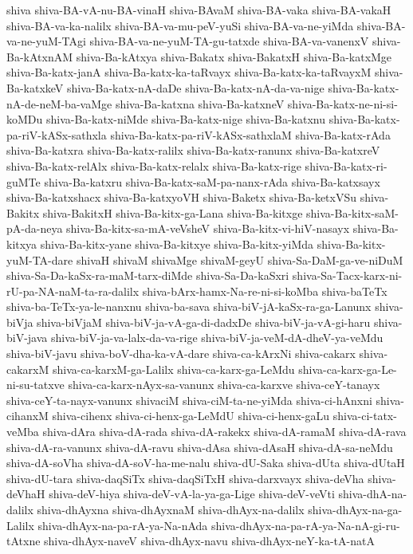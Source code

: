 {shiva
shiva-BA-vA-nu-BA-vinaH
shiva-BAvaM
shiva-BA-vaka
shiva-BA-vakaH
shiva-BA-va-ka-nalilx
shiva-BA-va-mu-peV-yuSi
shiva-BA-va-ne-yiMda
shiva-BA-va-ne-yuM-TAgi
shiva-BA-va-ne-yuM-TA-gu-tatxde
shiva-BA-va-vanenxV
shiva-Ba-kAtxnAM
shiva-Ba-kAtxya
shiva-Bakatx
shiva-BakatxH
shiva-Ba-katxMge
shiva-Ba-katx-janA
shiva-Ba-katx-ka-taRvayx
shiva-Ba-katx-ka-taRvayxM
shiva-Ba-katxkeV
shiva-Ba-katx-nA-daDe
shiva-Ba-katx-nA-da-va-nige
shiva-Ba-katx-nA-de-neM-ba-vaMge
shiva-Ba-katxna
shiva-Ba-katxneV
shiva-Ba-katx-ne-ni-si-koMDu
shiva-Ba-katx-niMde
shiva-Ba-katx-nige
shiva-Ba-katxnu
shiva-Ba-katx-pa-riV-kASx-sathxla
shiva-Ba-katx-pa-riV-kASx-sathxlaM
shiva-Ba-katx-rAda
shiva-Ba-katxra
shiva-Ba-katx-ralilx
shiva-Ba-katx-ranunx
shiva-Ba-katxreV
shiva-Ba-katx-relAlx
shiva-Ba-katx-relalx
shiva-Ba-katx-rige
shiva-Ba-katx-ri-guMTe
shiva-Ba-katxru
shiva-Ba-katx-saM-pa-nanx-rAda
shiva-Ba-katxsayx
shiva-Ba-katxshacx
shiva-Ba-katxyoVH
shiva-Baketx
shiva-Ba-ketxVSu
shiva-Bakitx
shiva-BakitxH
shiva-Ba-kitx-ga-Lana
shiva-Ba-kitxge
shiva-Ba-kitx-saM-pA-da-neya
shiva-Ba-kitx-sa-mA-veVsheV
shiva-Ba-kitx-vi-hiV-nasayx
shiva-Ba-kitxya
shiva-Ba-kitx-yane
shiva-Ba-kitxye
shiva-Ba-kitx-yiMda
shiva-Ba-kitx-yuM-TA-dare
shivaH
shivaM
shivaMge
shivaM-geyU
shiva-Sa-DaM-ga-ve-niDuM
shiva-Sa-Da-kaSx-ra-maM-tarx-diMde
shiva-Sa-Da-kaSxri
shiva-Sa-Tacx-karx-ni-rU-pa-NA-naM-ta-ra-dalilx
shiva-bArx-hamx-Na-re-ni-si-koMba
shiva-baTeTx
shiva-ba-TeTx-ya-le-nanxnu
shiva-ba-sava
shiva-biV-jA-kaSx-ra-ga-Lanunx
shiva-biVja
shiva-biVjaM
shiva-biV-ja-vA-ga-di-dadxDe
shiva-biV-ja-vA-gi-haru
shiva-biV-java
shiva-biV-ja-va-lalx-da-va-rige
shiva-biV-ja-veM-dA-dheV-ya-veMdu
shiva-biV-javu
shiva-boV-dha-ka-vA-dare
shiva-ca-kArxNi
shiva-cakarx
shiva-cakarxM
shiva-ca-karxM-ga-Lalilx
shiva-ca-karx-ga-LeMdu
shiva-ca-karx-ga-Le-ni-su-tatxve
shiva-ca-karx-nAyx-sa-vanunx
shiva-ca-karxve
shiva-ceY-tanayx
shiva-ceY-ta-nayx-vanunx
shivaciM
shiva-ciM-ta-ne-yiMda
shiva-ci-hAnxni
shiva-cihanxM
shiva-cihenx
shiva-ci-henx-ga-LeMdU
shiva-ci-henx-gaLu
shiva-ci-tatx-veMba
shiva-dAra
shiva-dA-rada
shiva-dA-rakekx
shiva-dA-ramaM
shiva-dA-rava
shiva-dA-ra-vanunx
shiva-dA-ravu
shiva-dAsa
shiva-dAsaH
shiva-dA-sa-neMdu
shiva-dA-soVha
shiva-dA-soV-ha-me-nalu
shiva-dU-Saka
shiva-dUta
shiva-dUtaH
shiva-dU-tara
shiva-daqSiTx
shiva-daqSiTxH
shiva-darxvayx
shiva-deVha
shiva-deVhaH
shiva-deV-hiya
shiva-deV-vA-la-ya-ga-Lige
shiva-deV-veVti
shiva-dhA-na-dalilx
shiva-dhAyxna
shiva-dhAyxnaM
shiva-dhAyx-na-dalilx
shiva-dhAyx-na-ga-Lalilx
shiva-dhAyx-na-pa-rA-ya-Na-nAda
shiva-dhAyx-na-pa-rA-ya-Na-nA-gi-ru-tAtxne
shiva-dhAyx-naveV
shiva-dhAyx-navu
shiva-dhAyx-neY-ka-tA-natA
}
